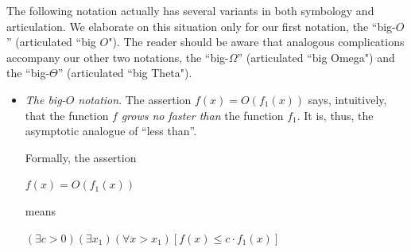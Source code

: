 \smallskip

The following notation actually has several variants in both symbology and articulation.  We elaborate on this situation only for our first notation, the ``big-$O$'' (articulated ``big $O$").  The reader should be aware that analogous complications accompany our other two notations, the ``big-$\Omega$'' (articulated ``big Omega") and the ``big-$\Theta$'' (articulated ``big Theta"). 
 
\begin{itemize}
\item
{\em The big-$O$ notation}.
The assertion $f(x) = O(f_1(x))$ says, intuitively, that the function $f$ {\em grows no faster than} the function $f_1$.  It is, thus, the asymptotic analogue of ``less than''.

\smallskip

Formally, the assertion

\hspace*{.2in}$f(x) = O(f_1(x))$

means

\hspace*{.2in}
$(\exists c >0)(\exists x_1)(\forall x > x_1)
[f(x) \leq c \cdot f_1(x)]$

\medskip

\noindent {}

\medskip

\noindent {}
\end{itemize}
